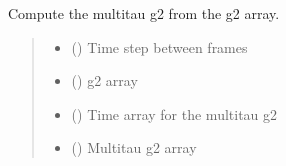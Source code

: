 \documentclass[letterpaper,10pt,english]{sphinxmanual}
\begin{document}

\begin{fulllineitems}
\label{\detokenize{index:XPCS_tools.get_g2_mt}}
\pysigstartsignatures
\pysiglinewithargsret
{}
{\sphinxparamcomma {}}
{}
\pysigstopsignatures
\sphinxAtStartPar
Compute the multitau g2 from the g2 array.
\begin{quote}\begin{description}
\begin{itemize}
\item {} 
\sphinxAtStartPar
{} () \textendash{} Time step between frames

\item {} 
\sphinxAtStartPar
{} () \textendash{} g2 array

\end{itemize}

\sphinxAtStartPar
\begin{itemize}
\item {} 
\sphinxAtStartPar
{} () \textendash{} Time array for the multitau g2

\item {} 
\sphinxAtStartPar
{} () \textendash{} Multitau g2 array

\end{itemize}


\end{description}\end{quote}

\end{fulllineitems}


\begin{fulllineitems}
\label{\detokenize{index:XPCS_tools.lambda2E}}
\pysigstartsignatures
\pysiglinewithargsret
{}
{}
{}
\pysigstopsignatures
\end{fulllineitems}
\end{document}
